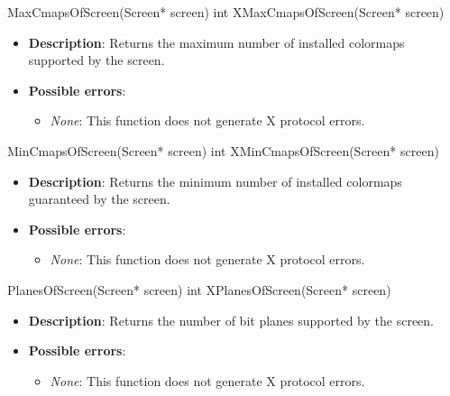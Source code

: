 \documentclass{report}
\begin{document}
\begin{itemize}
        \begin{cppcode}
            MaxCmapsOfScreen(Screen* screen)
            int XMaxCmapsOfScreen(Screen* screen)
        \end{cppcode}
        \begin{itemize}
            \item \textbf{Description}: Returns the maximum number of installed colormaps supported by the screen.
            \item \textbf{Possible errors}:
                \begin{itemize}
                    \item \textit{None}: This function does not generate X protocol errors.
                \end{itemize}
        \end{itemize}

        \begin{cppcode}
            MinCmapsOfScreen(Screen* screen)
            int XMinCmapsOfScreen(Screen* screen)
        \end{cppcode}
        \begin{itemize}
            \item \textbf{Description}: Returns the minimum number of installed colormaps guaranteed by the screen.
            \item \textbf{Possible errors}:
                \begin{itemize}
                    \item \textit{None}: This function does not generate X protocol errors.
                \end{itemize}
        \end{itemize}

        \begin{cppcode}
            PlanesOfScreen(Screen* screen)
            int XPlanesOfScreen(Screen* screen)
        \end{cppcode}
        \begin{itemize}
            \item \textbf{Description}: Returns the number of bit planes supported by the screen.
            \item \textbf{Possible errors}:
                \begin{itemize}
                    \item \textit{None}: This function does not generate X protocol errors.
                \end{itemize}
        \end{itemize}


\end{itemize}
\end{document}
